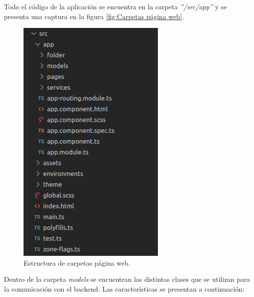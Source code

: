 Todo el código de la aplicación se encuentra en la carpeta \textit{''/src/app''} y se presenta una captura en la figura \ref{fig:Carpetas página web}.


\begin{figure}[ht]
	\centering
	\includegraphics[scale=.60]{./Figures/codigoFront.png}
	\caption{Estructura de carpetas página web.}
	\label{fig:Carpetas página web.}
\end{figure}

Dentro de la carpeta \textit{models} se encuentran las distintas clases que se utilizan para la comunicación con el backend. Las características se presentan a continuación:

